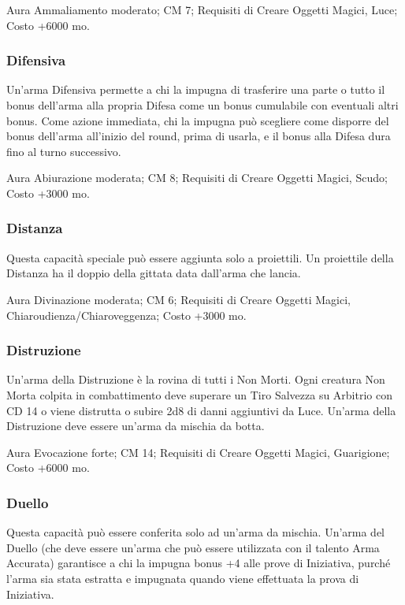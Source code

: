 \begin{multicols}{2}
Aura Ammaliamento moderato; CM 7; Requisiti di Creare Oggetti Magici, Luce; Costo +6000 mo.

\subsubsection{Difensiva}

Un'arma Difensiva permette a chi la impugna di trasferire una parte o tutto il bonus dell'arma alla propria Difesa come un bonus cumulabile con eventuali altri bonus. Come azione immediata, chi la impugna può scegliere come disporre del bonus dell'arma all'inizio del round, prima di usarla, e il bonus alla Difesa dura fino al turno successivo.

Aura Abiurazione moderata; CM 8; Requisiti di Creare Oggetti Magici, Scudo; Costo +3000 mo.

\subsubsection{Distanza}

Questa capacità speciale può essere aggiunta solo a proiettili. Un proiettile della Distanza ha il doppio della gittata data dall'arma che lancia.

Aura Divinazione moderata; CM 6; Requisiti di Creare Oggetti Magici, Chiaroudienza/Chiaroveggenza; Costo +3000 mo.


\subsubsection{Distruzione}

Un'arma della Distruzione è la rovina di tutti i Non Morti. Ogni creatura Non Morta colpita in combattimento deve superare un Tiro Salvezza su Arbitrio con CD 14 o viene distrutta o subire 2d8 di danni aggiuntivi da Luce. Un'arma della Distruzione deve essere un'arma da mischia da botta.

Aura Evocazione forte; CM 14; Requisiti di Creare Oggetti Magici, Guarigione; Costo +6000 mo.

\subsubsection{Duello}

Questa capacità può essere conferita solo ad un'arma da mischia. Un'arma del Duello (che deve essere un'arma che può essere utilizzata con il talento Arma Accurata) garantisce a chi la impugna bonus +4 alle prove di Iniziativa, purché l'arma sia stata estratta e impugnata quando viene effettuata la prova di Iniziativa. \\


\end{multicols}
